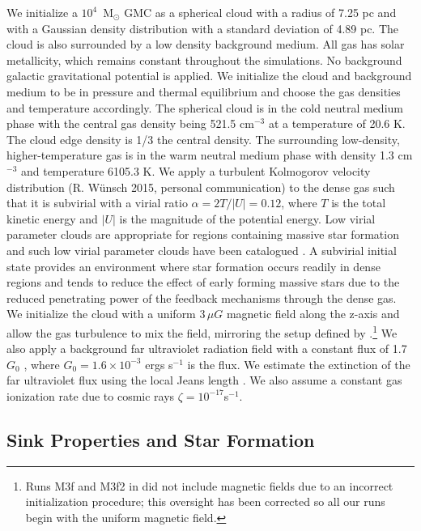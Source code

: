 \documentclass[twoside]{drexel-thesis}
\begin{document}
\begin{thesis}
We initialize a $10^4$~M$_{\odot}$ GMC as a spherical cloud with a radius of 7.25 pc and with a Gaussian density distribution \citep{bate_modelling_1995} with a standard deviation of 4.89 pc. The cloud is also surrounded by a low density background medium. All gas has solar metallicity, which remains constant throughout the simulations. No background galactic gravitational potential is applied.
We initialize the cloud and background medium to be in pressure and thermal equilibrium and choose the gas densities and temperature accordingly. The spherical cloud is in the cold neutral medium phase with the central gas density being 521.5 cm$^{-3}$ at a temperature of 20.6 K. The cloud edge density is 1/3 the central density. The surrounding low-density, higher-temperature gas is in the warm neutral medium phase with density 1.3 cm$^{-3}$ and temperature 6105.3 K.
We apply a turbulent Kolmogorov velocity distribution (R. W\"unsch 2015, personal communication) to the dense gas such that it is subvirial with a virial ratio $\alpha = 2T/|U| = 0.12$, where $T$ is the total kinetic energy and $|U|$ is the magnitude of the potential energy. Low virial parameter clouds are appropriate for regions containing massive star formation \citep{kauffmann_low_2013} and such low virial parameter clouds have been catalogued \citep{roman-duval_physical_2010, wienen_ammonia_2012}.
A subvirial initial state provides an environment where star formation occurs readily in dense regions and tends to reduce the effect of early forming massive stars due to the reduced penetrating power of the feedback mechanisms through the dense gas.
We initialize the cloud with a uniform $3\,\mu G$ magnetic field along the z-axis and allow the gas turbulence to mix the field, mirroring the setup defined by \citet{wall_collisional_2019,wall_modeling_2020}.\footnote{Runs M3f and M3f2 in \citet{wall_modeling_2020} did not include magnetic fields due to an incorrect initialization procedure; this oversight has been corrected so all our runs begin with the uniform magnetic field.} 
We also apply a background far ultraviolet radiation field with a constant flux of 1.7$G_{0}$ \citep{draine_photoelectric_1978}, where $G_{0}=1.6\times10^{-3}$ ergs s$^{-1}$ is the \citet{habing_interstellar_1968} flux. We estimate the extinction of the far ultraviolet flux using the local Jeans length \citep{truelove_jeans_1997}. We also assume a constant gas ionization rate due to cosmic rays $\zeta=10^{-17}$s$^{-1}$.


\subsection{Sink Properties and Star Formation}


\end{thesis}
\end{document}
